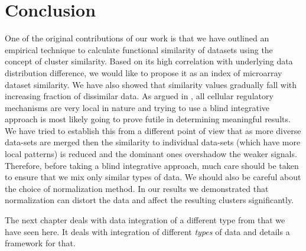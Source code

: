\section{Conclusion}
One of the original contributions of our work is that we have outlined an empirical technique to calculate functional similarity of datasets using the concept of cluster similarity. Based on its high correlation with underlying data distribution difference, we would like to propose it as an index of microarray dataset similarity. We have also showed that similarity values gradually fall with increasing fraction of dissimilar data. As argued in \citet{orph02thehuman}, all cellular regulatory mechanisms are very local in nature and trying to use a blind integrative approach is most likely going to prove futile in determining meaningful results. We have tried to establish this from a different point of view that as more diverse data-sets are merged then the similarity to individual data-sets (which have more local patterns) is reduced and the dominant ones overshadow the weaker signals. Therefore, before taking a blind integrative approach, much care should be taken to ensure that we mix only similar types of data. We should also be careful about the choice of normalization method. In our results we demonstrated that normalization can distort the data and affect the resulting clusters significantly.

The next chapter deals with data integration of a different type from that we have seen here. It deals with integration of different \textit{types} of data and details a framework for that.
